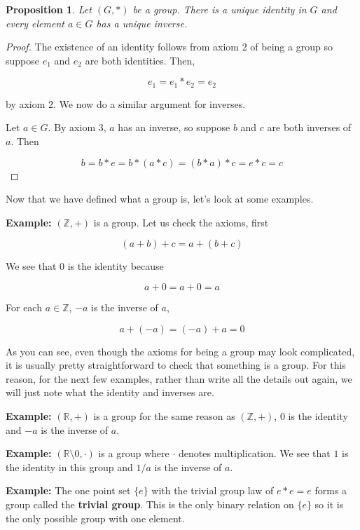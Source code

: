 \documentclass[a4paper]{article}
\newtheorem{proposition}[theorem]{Proposition}
\numberwithin{theorem}{section}
\begin{document}
\begin{proposition}
Let $(G,\ast)$ be a group. There is a unique identity in $G$ and every element $a \in G$ has a unique inverse.
\end{proposition}

\begin{proof}
The existence of an identity follows from axiom 2 of being a group so suppose $e_1$ and $e_2$ are both identities. Then,

$$ e_1 = e_1 \ast e_2 = e_2 $$

by axiom 2. We now do a similar argument for inverses.

Let $a \in G$. By axiom 3, $a$ has an inverse, so suppose $b$ and $c$ are both inverses of $a$. Then

$$ b = b \ast e = b \ast (a \ast c) = (b \ast a) \ast c = e \ast c = c $$

\end{proof}

Now that we have defined what a group is, let's look at some examples.

\textbf{Example:} $(\mathbb{Z},+)$ is a group. Let us check the axioms, first

$$ (a+b)+c = a+(b+c) $$

We see that $0$ is the identity because

$$ a+0 = a+0 = a $$

For each $a \in \mathbb{Z}$, $-a$ is the inverse of $a$,

$$ a + (-a) = (-a) + a = 0 $$

As you can see, even though the axioms for being a group may look complicated, it is usually pretty straightforward to check that something is a group. For this reason, for the next few examples, rather than write all the details out again, we will just note what the identity and inverses are.

\textbf{Example:} $(\mathbb{R},+)$ is a group for the same reason as $(\mathbb{Z},+)$, $0$ is the identity and $-a$ is the inverse of $a$.

\textbf{Example:} $(\mathbb{R} \setminus 0, \cdot)$ is a group where $\cdot$ denotes multiplication. We see that $1$ is the identity in this group and $1/a$ is the inverse of $a$.

\textbf{Example:} The one point set $\{e\}$ with the trivial group law of $e \ast e = e$ forms a group called the \textbf{trivial group}. This is the only binary relation on $\{e\}$ so it is the only possible group with one element.
\end{document}
